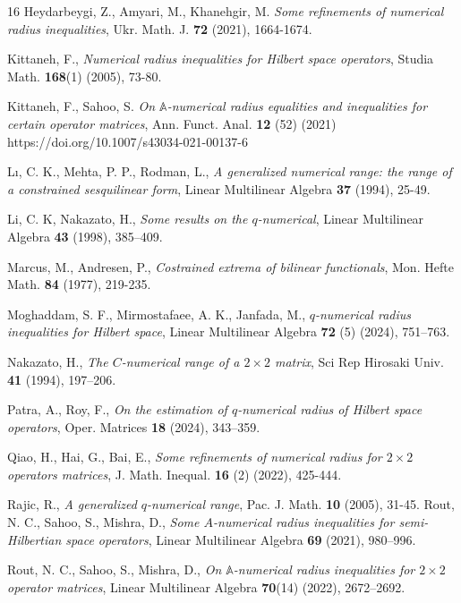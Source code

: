 \documentclass[preprint,12pt,3p]{elsarticle}
\begin{document}
\begin{thebibliography}{16}
 Heydarbeygi, Z., Amyari, M., Khanehgir, M. \textit{Some refinements of numerical radius inequalities}, Ukr. Math. J. {\bf 72} (2021), 1664-1674.

 Kittaneh, F., \textit{Numerical radius inequalities for Hilbert space operators}, Studia Math. {\bf 168}(1) (2005), 73-80.

  Kittaneh, F., Sahoo, S. \textit{On $ \mathbb{A}$-numerical radius equalities and inequalities for certain operator matrices}, Ann. Funct. Anal. \textbf{12} (52) (2021) 
 {https://doi.org/10.1007/s43034-021-00137-6}
 
 L{\i}, C. K., Mehta, P. P., Rodman, L.,  \textit{A generalized numerical range: the range of a constrained sesquilinear form}, Linear Multilinear Algebra {\bf 37} (1994), 25-49.

 Li, C. K, Nakazato, H., \textit{Some results on the $q$-numerical}, Linear Multilinear Algebra
{\bf 43} (1998), 385--409.

 Marcus, M., Andresen, P., \textit{ Costrained extrema of bilinear functionals}, Mon. Hefte Math. {\bf 84} (1977), 219-235.

  Moghaddam, S. F., Mirmostafaee, A. K., Janfada, M., \textit{$q$-numerical radius inequalities for Hilbert space}, Linear Multilinear Algebra {\bf 72} (5) (2024), 751--763.

 Nakazato, H., \textit{The $C$-numerical range of a $2\times2$ matrix}, Sci Rep Hirosaki Univ. {\bf 41} (1994), 197--206.

 Patra, A., Roy, F., \textit{On the estimation of $q$-numerical radius of Hilbert space operators}, Oper. Matrices {\bf 18} (2024), 343--359.

 Qiao, H., Hai, G., Bai, E.,  \textit{Some refinements of numerical radius for $ 2\times 2 $ operators matrices}, J. Math. Inequal. {\bf 16} (2) (2022), 425-444.

 Rajic, R., \textit{A generalized $ q$-numerical range}, Pac. J. Math. {\bf 10} (2005), 31-45.
 Rout, N. C., Sahoo, S., Mishra, D., \textit{Some $A$-numerical radius inequalities for semi-Hilbertian space operators}, Linear  Multilinear Algebra {\bf 69} (2021), 980--996.
		
		 Rout, N. C., Sahoo, S., Mishra, D.,
		\textit{On $\mathbb{A}$-numerical radius inequalities for $2\times2$ operator matrices}, Linear  Multilinear Algebra \textbf{70}(14) (2022), 2672--2692.


\end{thebibliography}
\end{document}

